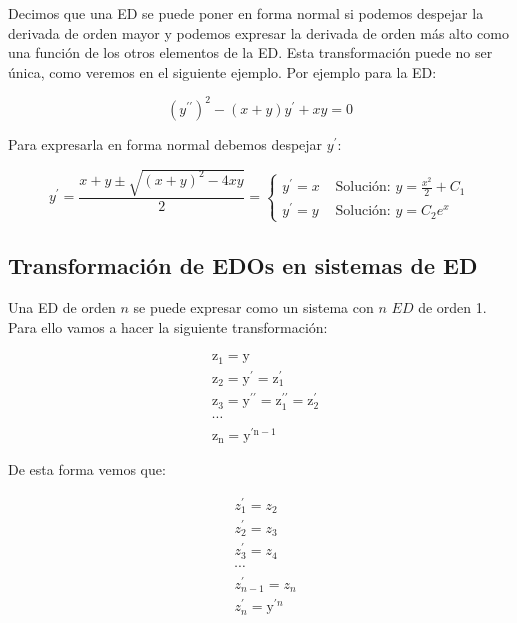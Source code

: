 \documentclass[a4paper,12pt,titlepage]{article}
\begin{document}
Decimos que una ED se puede poner en forma normal si podemos despejar la derivada de orden mayor y podemos expresar la derivada de orden más alto como una función de los otros elementos de la ED. Esta transformación puede no ser única, como veremos en el siguiente ejemplo. Por ejemplo para la ED:

\begin{equation*}
    (y^{\prime \prime})^2 - (x+y)y^{\prime} + xy = 0
\end{equation*}

Para expresarla en forma normal debemos despejar $y^{\prime}$:

\begin{equation*}
    y^{\prime}=\frac{x+y \pm \sqrt{(x+y)^2-4 x y}}{2}= \begin{cases}y^{\prime}=x & \text { Solución: } y=\frac{x^2}{2}+C_1 \\ y^{\prime}=y & \text { Solución: } y=C_2 e^x\end{cases}
    \end{equation*}

\subsection{Transformación de EDOs en sistemas de ED}

Una ED de orden $n$ se puede expresar como un sistema con $n$ $ED$ de orden 1. Para ello vamos a hacer la siguiente transformación:

\begin{equation*}
    \begin{aligned}
    & \mathrm{z}_1=\mathrm{y} \\
    & \mathrm{z}_2=\mathrm{y}^{\prime}=\mathrm{z}_1^{\prime} \\
    & \mathrm{z}_3=\mathrm{y}^{\prime \prime}=\mathrm{z}_1^{\prime \prime}=\mathrm{z}_2^{\prime} \\
    & \cdots \\
    & \mathrm{z}_{\mathrm{n}}=\mathrm{y}^{\prime \mathrm{n}-1}
    \end{aligned}
    \end{equation*}

De esta forma vemos que:

\begin{equation*}
    \begin{aligned}
    & z_1^{\prime}=z_2 \\
    & z_2^{\prime}=z_3 \\
    & z_3^{\prime}=z_4 \\
    & \cdots \\
    & z_{n-1}^{\prime}=z_n \\
    & z_n^{\prime}=\mathrm{y}^{\prime n}
    \end{aligned}
    \end{equation*}
\end{document}
